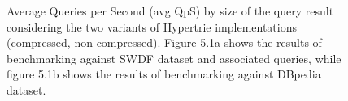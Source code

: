 \begin{figure}[h]
	\label{fig:benchmarks}
	\centering
	
	
	\caption{Average Queries per Second (avg QpS) by size of the query result considering the two variants of Hypertrie implementations (compressed, non-compressed). Figure 5.1a shows the results of benchmarking against SWDF dataset and associated queries, while figure 5.1b shows  the results of benchmarking against DBpedia dataset.}
\end{figure}

\clearpage